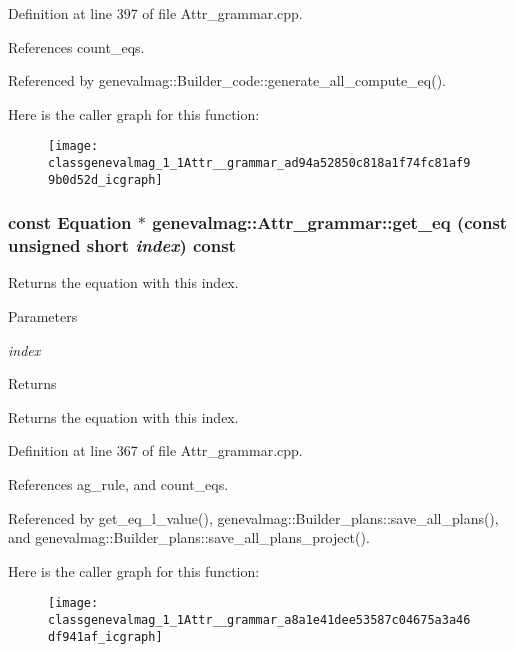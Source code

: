Definition at line 397 of file Attr\_\-grammar.cpp.



References count\_\-eqs.



Referenced by genevalmag::Builder\_\-code::generate\_\-all\_\-compute\_\-eq().



Here is the caller graph for this function:\nopagebreak
\begin{figure}[H]
\begin{center}
\leavevmode
\texttt{[image: classgenevalmag\_1\_1Attr\_\_grammar\_ad94a52850c818a1f74fc81af99b0d52d\_icgraph]}
\end{center}
\end{figure}


\hypertarget{classgenevalmag_1_1Attr__grammar_a8a1e41dee53587c04675a3a46df941af}{
\subsubsection[{get\_\-eq}]{\setlength{\rightskip}{0pt plus 5cm}const {\bf Equation} $\ast$ genevalmag::Attr\_\-grammar::get\_\-eq (const unsigned short {\em index}) const}}
\label{classgenevalmag_1_1Attr__grammar_a8a1e41dee53587c04675a3a46df941af}
Returns the equation with this index. 
\begin{DoxyParams}{Parameters}
\item[{\em index}]\end{DoxyParams}
\begin{DoxyReturn}{Returns}

\end{DoxyReturn}
Returns the equation with this index. 

Definition at line 367 of file Attr\_\-grammar.cpp.



References ag\_\-rule, and count\_\-eqs.



Referenced by get\_\-eq\_\-l\_\-value(), genevalmag::Builder\_\-plans::save\_\-all\_\-plans(), and genevalmag::Builder\_\-plans::save\_\-all\_\-plans\_\-project().



Here is the caller graph for this function:\nopagebreak
\begin{figure}[H]
\begin{center}
\leavevmode
\texttt{[image: classgenevalmag\_1\_1Attr\_\_grammar\_a8a1e41dee53587c04675a3a46df941af\_icgraph]}
\end{center}
\end{figure}


